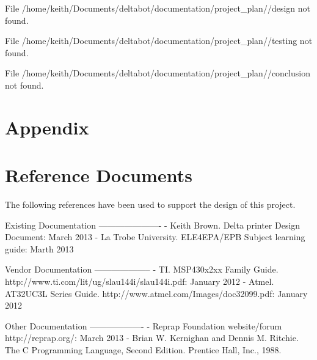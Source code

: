 \documentclass[a4paper, 11pt, oneside]{Thesis}  %
\begin{document}
\clearpage  %



\clearpage  %



\tableofcontents  %



\mainmatter
\pagestyle{fancy}

{\color{red}File /home/keith/Documents/deltabot/documentation/project\_plan//design not found.}

{\color{red}File /home/keith/Documents/deltabot/documentation/project\_plan//testing not found.}

{\color{red}File /home/keith/Documents/deltabot/documentation/project\_plan//conclusion not found.}

\section{Appendix}

\section{Reference Documents}

The following references have been used to support the design of this project.

Existing Documentation
----------------------
- Keith Brown. Delta printer Design Document: March 2013
- La Trobe University. ELE4EPA/EPB Subject learning guide: Marth 2013

Vendor Documentation
--------------------
- TI. MSP430x2xx Family Guide.  http://www.ti.com/lit/ug/slau144i/slau144i.pdf: January 2012
- Atmel. AT32UC3L Series Guide. http://www.atmel.com/Images/doc32099.pdf: January 2012

Other Documentation
-------------------
- Reprap Foundation website/forum http://reprap.org/: March 2013
- Brian W. Kernighan and Dennis M. Ritchie. The C Programming Language, Second Edition. Prentice Hall, Inc., 1988.
\end{document}
